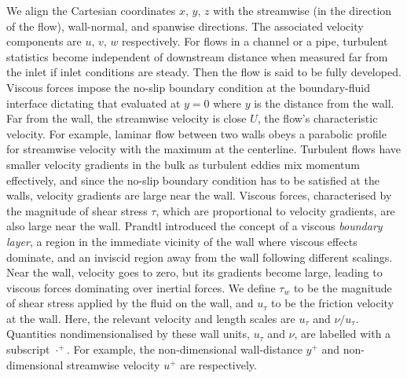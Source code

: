We align the Cartesian coordinates $x ,\,y ,\,z$ with the streamwise (in the direction of the flow), wall-normal, and spanwise directions. The associated velocity components are $u ,\,v ,\,w$ respectively. For flows in a channel or a pipe, turbulent statistics become independent of downstream distance when measured far from the inlet if inlet conditions are steady. Then the flow is said to be fully developed. Viscous forces impose the no-slip boundary condition at the boundary-fluid interface dictating that
evaluated at $y=0$ where $y$ is the distance from the wall. Far from the wall, the streamwise velocity is close $U$, the flow's characteristic velocity. For example, laminar flow between two walls obeys a parabolic profile for streamwise velocity with the maximum at the centerline. Turbulent flows have smaller velocity gradients in the bulk as turbulent eddies mix momentum effectively, and since the no-slip boundary condition has to be satisfied at the walls, velocity gradients are large near the wall. Viscous forces, characterised by the magnitude of shear stress $\tau$, which are proportional to velocity gradients, are also large near the wall.
Prandtl introduced the concept of a viscous \textit{boundary layer}, a region in the immediate vicinity of the wall where viscous effects dominate, and an inviscid region away from the wall following different scalings. Near the wall, velocity goes to zero, but its gradients become large, leading to viscous forces dominating over inertial forces. We define $\tau_w$ to be the magnitude of shear stress applied by the fluid on the wall, and $u_\tau$ to be the friction velocity at the wall.
Here, the relevant velocity and length scales are $u_\tau$ and $\nu/u_\tau$. Quantities nondimensionalised by these wall units, $u_\tau$ and $\nu$, are labelled with a subscript $\cdot^+$. For example, the non-dimensional wall-distance $y^+$ and non-dimensional streamwise velocity $u^+$ are
respectively.

